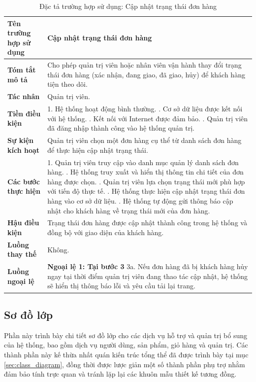 \begin{longtable}{|>{\bfseries}p{4cm}|p{11.5cm}|}
\caption{Đặc tả trường hợp sử dụng: Cập nhật trạng thái đơn hàng}
\label{tab:uc-admin-update-order-status} \\
\hline
\textbf{Tên trường hợp sử dụng} & Cập nhật trạng thái đơn hàng \\
\hline
\textbf{Tóm tắt mô tả} & Cho phép quản trị viên hoặc nhân viên vận hành thay đổi trạng thái đơn hàng (xác nhận, đang giao, đã giao, hủy) để khách hàng tiện theo dõi. \\
\hline
\textbf{Tác nhân} & Quản trị viên. \\
\hline
\textbf{Tiền điều kiện} & 1. Hệ thống hoạt động bình thường. \newline
2. Cơ sở dữ liệu được kết nối với hệ thống. \newline
3. Kết nối với Internet được đảm bảo. \newline
4. Quản trị viên đã đăng nhập thành công vào hệ thống quản trị. \\
\hline
\textbf{Sự kiện kích hoạt} & Quản trị viên chọn một đơn hàng cụ thể từ danh sách đơn hàng để thực hiện cập nhật trạng thái. \\
\hline
\textbf{Các bước thực hiện} & 1. Quản trị viên truy cập vào danh mục quản lý danh sách đơn hàng. \newline
2. Hệ thống truy xuất và hiển thị thông tin chi tiết của đơn hàng được chọn. \newline
3. Quản trị viên lựa chọn trạng thái mới phù hợp với tiến độ thực tế. \newline
4. Hệ thống thực hiện cập nhật trạng thái đơn hàng vào cơ sở dữ liệu. \newline
5. Hệ thống tự động gửi thông báo cập nhật cho khách hàng về trạng thái mới của đơn hàng. \\
\hline
\textbf{Hậu điều kiện} & Trạng thái đơn hàng được cập nhật thành công trong hệ thống và đồng bộ với giao diện của khách hàng. \\
\hline
\textbf{Luồng thay thế} & Không. \\
\hline
\textbf{Luồng ngoại lệ} & \textbf{Ngoại lệ 1: Tại bước 3} \newline
3a. Nếu đơn hàng đã bị khách hàng hủy ngay tại thời điểm quản trị viên đang thao tác cập nhật, hệ thống sẽ hiển thị thông báo lỗi và yêu cầu tải lại trang. \\
\hline
\end{longtable}

\subsection*{Sơ đồ lớp} \label{sec:appx_class_diagram}
Phần này trình bày chi tiết sơ đồ lớp cho các dịch vụ hỗ trợ và quản trị bổ sung của hệ thống, bao gồm dịch vụ người dùng, sản phẩm, giỏ hàng và quản trị. Các thành phần này kế thừa nhất quán kiến trúc tổng thể đã được trình bày tại mục \ref{sec:class_diagram}, đồng thời được lược giản một số thành phần phụ trợ nhằm đảm bảo tính trực quan và tránh lặp lại các khuôn mẫu thiết kế tương đồng.

